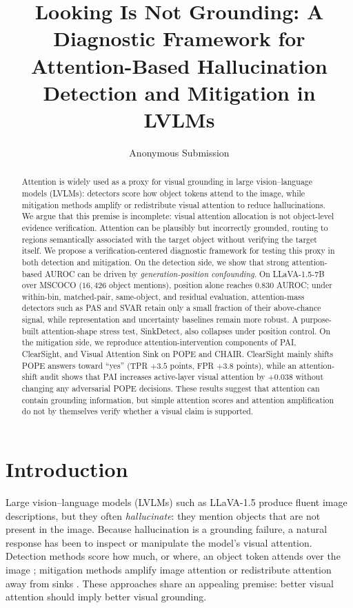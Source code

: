 \documentclass[letterpaper]{article} \usepackage[submission]{aaai2027}  \usepackage[hyphens]{url}  \usepackage{graphicx} \urlstyle{rm} \def\UrlFont{\rm}  \usepackage{natbib}  \usepackage{caption} \frenchspacing
\title{Looking Is Not Grounding: A Diagnostic Framework for Attention-Based Hallucination Detection and Mitigation in LVLMs}
\author{Anonymous Submission}
\begin{document}
\maketitle

\begin{abstract}
Attention is widely used as a proxy for visual grounding in large vision--language models (LVLMs): detectors score how object tokens attend to the image, while mitigation methods amplify or redistribute visual attention to reduce hallucinations. We argue that this premise is incomplete: visual attention allocation is not object-level evidence verification. Attention can be plausibly but incorrectly grounded, routing to regions semantically associated with the target object without verifying the target itself. We propose a verification-centered diagnostic framework for testing this proxy in both detection and mitigation. On the detection side, we show that strong attention-based AUROC can be driven by \emph{generation-position confounding}. On LLaVA-1.5-7B over MSCOCO ($16{,}426$ object mentions), position alone reaches $0.830$ AUROC; under within-bin, matched-pair, same-object, and residual evaluation, attention-mass detectors such as PAS and SVAR retain only a small fraction of their above-chance signal, while representation and uncertainty baselines remain more robust. A purpose-built attention-shape stress test, SinkDetect, also collapses under position control. On the mitigation side, we reproduce attention-intervention components of PAI, ClearSight, and Visual Attention Sink on POPE and CHAIR. ClearSight mainly shifts POPE answers toward ``yes'' (TPR $+3.5$ points, FPR $+3.8$ points), while an attention-shift audit shows that PAI increases active-layer visual attention by $+0.038$ without changing any adversarial POPE decisions. These results suggest that attention can contain grounding information, but simple attention scores and attention amplification do not by themselves verify whether a visual claim is supported.
\end{abstract}
 \section{Introduction}

Large vision--language models (LVLMs) such as LLaVA-1.5 \cite{liu2023llava} produce fluent image descriptions, but they often \emph{hallucinate}: they mention objects that are not present in the image. Because hallucination is a grounding failure, a natural response has been to inspect or manipulate the model's visual attention. Detection methods score how much, or where, an object token attends over the image \cite{jiang2024devils,hoangxuan2026pas}; mitigation methods amplify image attention or redistribute attention away from sinks \cite{liu2024pai,yin2025clearsight,kang2025visualsink}. These approaches share an appealing premise: better visual attention should imply better visual grounding.
\end{document}
